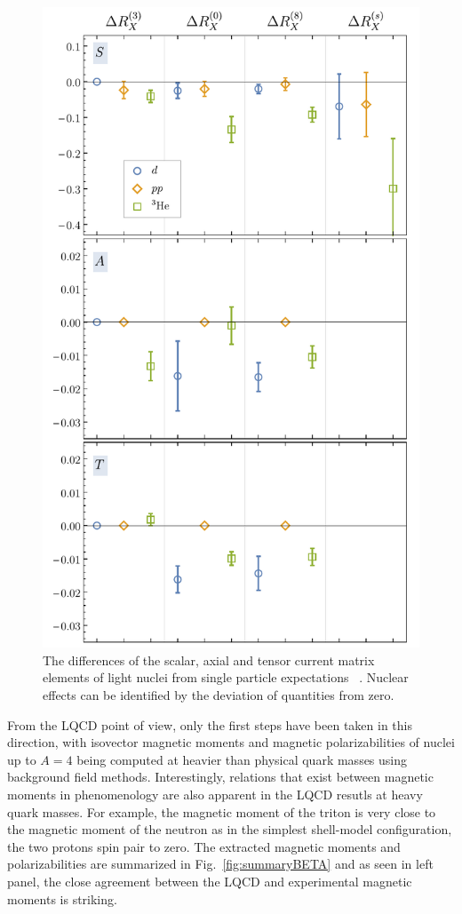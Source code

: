 %
\begin{figure}
	\vspace*{-0cm}
	\centering
	\includegraphics[width=0.4\columnwidth]{figures/RatioSummary.pdf}  
	\caption{ 
		The differences of the scalar, axial and tensor current matrix elements of light nuclei from single particle expectations ~\protect\cite{Beane:2015yha}. Nuclear effects can be identified by the deviation of quantities from zero.   
	}
	\label{fig:SAT}
	\vspace*{-0.5cm}
\end{figure}
%
From the LQCD point of view, only the first steps have been taken in this direction, with isovector magnetic moments \cite{Beane:2014ora,Beane:2015yha,Detmold:2015daa} and magnetic  polarizabilities \cite{Chang:2015qxa} of nuclei up to $A=4$ being computed at heavier than physical quark masses using background field methods. Interestingly, relations that exist between magnetic moments in phenomenology are also apparent in the LQCD resutls at heavy quark masses. For example,  the magnetic moment of the triton is very close to the magnetic moment of the neutron as in the simplest shell-model configuration, the two protons spin pair to zero. The extracted magnetic moments and polarizabilities are summarized in Fig.~\ref{fig:summaryBETA} and as seen in left panel, the close agreement between the LQCD  and experimental magnetic moments is striking.

